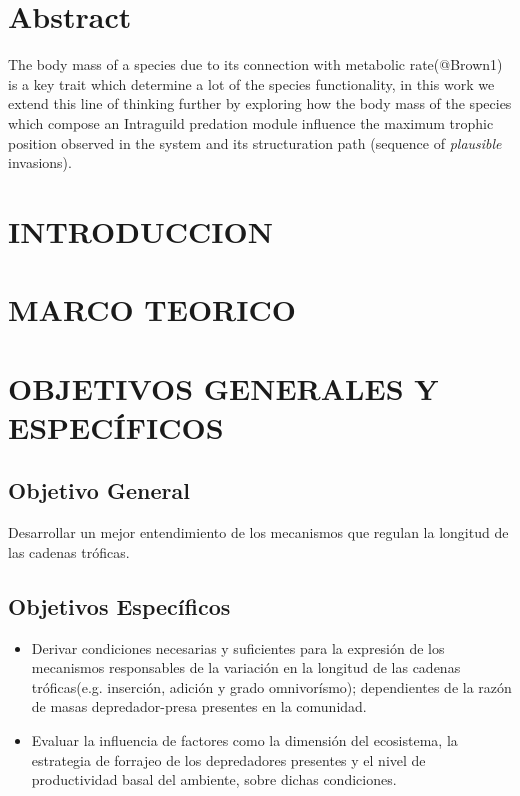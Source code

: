 \documentclass [12pt]{article}
\numberwithin{equation}{section}
\begin{document}
\setcounter{tocdepth}{3}
\tableofcontents
\listoffigures
\section{Abstract}

The body mass of a species due to its connection with metabolic rate(@Brown1) is a key trait which determine a lot of the species functionality, in this work we extend this line of thinking further by exploring how the body mass of the species which compose an Intraguild predation module influence the maximum trophic position observed in the system and its structuration path (sequence of \textit{plausible} invasions).

\section{INTRODUCCION}


\section{MARCO TEORICO}


\section{OBJETIVOS GENERALES Y ESPEC\'IFICOS}
\subsection{Objetivo General}
Desarrollar un mejor entendimiento de los mecanismos que regulan la longitud de las cadenas tr\'oficas.
\subsection{Objetivos Espec\'ificos}
\begin{itemize}
\item Derivar condiciones necesarias y suficientes para la expresi\'on de los mecanismos responsables de la variaci\'on en la longitud de las cadenas tr\'oficas(e.g. inserci\'on, adici\'on y  grado omnivor\'ismo); dependientes de la raz\'on de masas depredador-presa presentes en la comunidad.
\item Evaluar la influencia de factores como la dimensi\'on del ecosistema, la estrategia de forrajeo de los depredadores presentes y el nivel de productividad basal del ambiente, sobre dichas condiciones.
\end{itemize}
\end{document}
